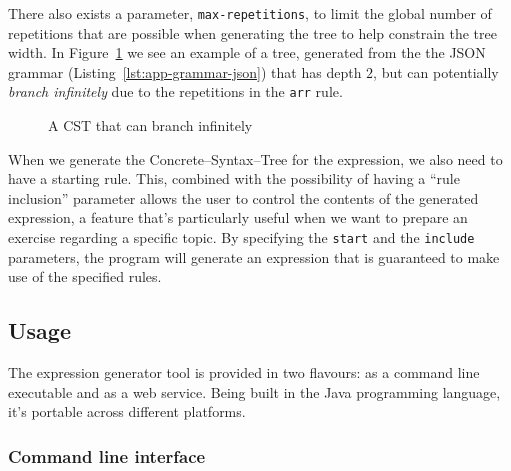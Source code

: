 \documentclass[]{usiinfbachelorproject}
\begin{document}
There also exists a parameter, \texttt{max-repetitions}, to limit the global
number of repetitions that are possible when generating the tree to help
constrain the tree width. In Figure~\ref{user-constraints-cst-json-arr} we
see an example of a tree, generated from the the JSON grammar
(Listing~\ref{lst:app-grammar-json}) that has depth $ 2 $, but can potentially
\textit{branch infinitely} due to the repetitions in the \texttt{arr} rule.

\begin{figure}[ht]
\centering
{}
\caption{A CST that can branch infinitely
}\label{user-constraints-cst-json-arr}
\end{figure}

When we generate the Concrete–Syntax–Tree for the expression, we also need to 
have a starting rule. This, combined with the possibility of having a
``rule inclusion'' parameter allows the user to control the contents of
the generated expression, a feature that's particularly useful when
we want to prepare an exercise regarding a specific topic. By specifying
the \texttt{start} and the \texttt{include} parameters, the program will
generate an expression that is guaranteed to make use of the specified rules.

\subsection{Usage}\label{user-usage}

The expression generator tool is provided in two flavours: as a command line
executable and as a web service. Being built in the Java programming language,
it's portable across different platforms.

\subsubsection{Command line interface}\label{user-usage-cli}

\end{document}
